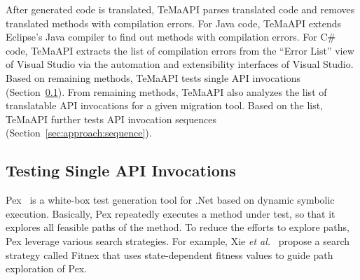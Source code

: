 After generated code is translated, TeMaAPI parses translated code and removes translated methods with compilation errors. For Java code, TeMaAPI extends Eclipse's Java compiler to find out methods with compilation errors. For C\# code, TeMaAPI extracts the list of compilation errors from the ``Error List'' view of Visual Studio via the automation and extensibility interfaces of Visual Studio. Based on remaining methods, TeMaAPI tests single API invocations (Section~\ref{sec:approach:single}). From remaining methods, TeMaAPI also analyzes the list of translatable API invocations for a given migration tool. Based on the list, TeMaAPI further tests API invocation sequences (Section~\ref{sec:approach:sequence}).


%


\subsection{Testing Single API Invocations}
\label{sec:approach:single}

Pex~\cite{tillmann2008pex} is a white-box test generation tool for .Net based on dynamic symbolic execution. Basically, Pex repeatedly executes a method under test, so that it explores all feasible paths of the method. To reduce the efforts to explore paths, Pex leverage various search strategies. For example, Xie \emph{et al.}~\cite{xie09:fitness} propose a search strategy called Fitnex that uses state-dependent fitness values to guide path exploration of Pex.

